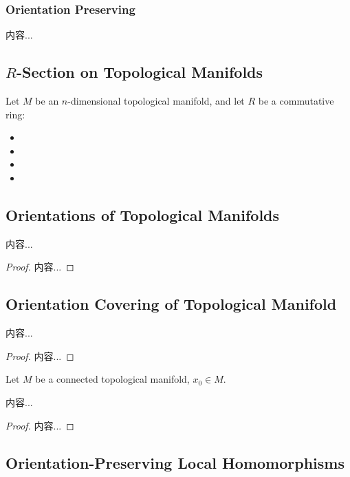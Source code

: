 \documentclass[Total.tex]{subfiles}
\begin{document}
				\subsubsection{Orientation Preserving}
				\begin{Def}
					内容...
				\end{Def}
				\subsection{$R$-Section on Topological Manifolds}
				\begin{Def}
					Let $M$ be an $n$-dimensional topological manifold, and let $R$ be a commutative ring:
					\begin{itemize}
						\item 
						\item 
						\item 
						\item 
					\end{itemize}
				\end{Def}
				\subsection{Orientations of Topological Manifolds}
				\begin{lemma}
					内容...
				\end{lemma}
				\begin{proof}
					内容...
				\end{proof}
				\subsection{Orientation Covering of Topological Manifold}
					\begin{proposition}
						内容...
					\end{proposition}
					\begin{proof}
						内容...
					\end{proof}
					
					\begin{Def}
						Let $M$ be a connected topological manifold, $x_0\in M$.
					\end{Def}
					
					\begin{corollary}
						内容...
					\end{corollary}
					\begin{proof}
						内容...
					\end{proof}
				\subsection{Orientation-Preserving Local Homomorphisms}
\end{document}
